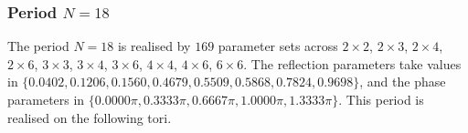 \par
\subsubsection{Period $N = 18$}
The period $N=18$ is realised by $169$ parameter sets across $2\times2$, $2\times3$, $2\times4$, $2\times6$, $3\times3$, $3\times4$, $3\times6$, $4\times4$, $4\times6$, $6\times6$. The reflection parameters take values in $\{0.0402, 0.1206, 0.1560, 0.4679, 0.5509, 0.5868, 0.7824, 0.9698\}$, and the phase parameters in $\{0.0000\pi, 0.3333\pi, 0.6667\pi, 1.0000\pi, 1.3333\pi\}$. This period is realised on the following tori.

